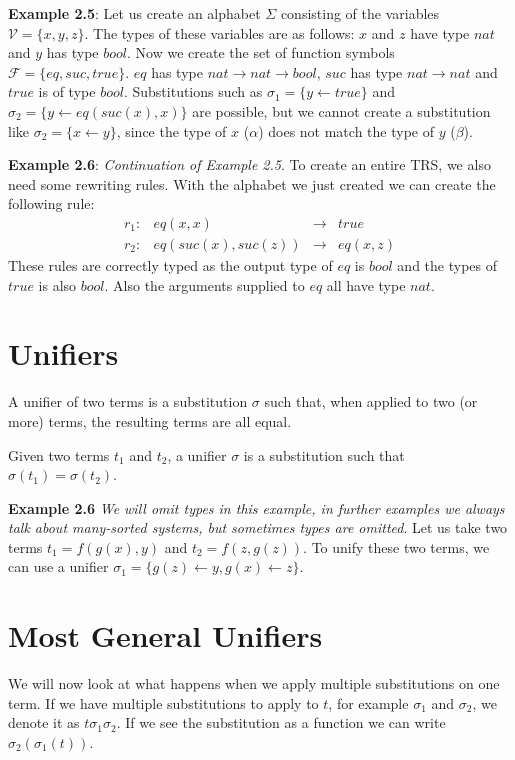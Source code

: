 \textbf{Example 2.5}: Let us create an alphabet $\Sigma$ consisting of the variables $\mathcal{V} = \{ x, y, z\}$. The types of these variables are as follows: $x$ and $z$ have type $nat$ and $y$ has type $bool$. Now we create the set of function symbols $\mathcal{F} = \{ eq, suc, true \}$. $eq$ has type $nat \rightarrow nat \rightarrow bool$, $suc$ has type $nat \rightarrow nat$ and $true$ is of type $bool$. Substitutions such as $\sigma_1 = \{ y \leftarrow true \}$ and $\sigma_2 = \{ y \leftarrow eq(suc(x), x) \}$ are possible, but we cannot create a substitution like $\sigma_2 = \{ x \leftarrow y \}$, since the type of $x$ ($\alpha$) does not match the type of $y$ ($\beta$).

\textbf{Example 2.6}: \textit{Continuation of Example 2.5}. To create an entire TRS, we also need some rewriting rules. With the alphabet we just created we can create the following rule: 
$$
\begin{array}{lrcl}
    r_1: & eq(x, x) & \rightarrow & true \\
    r_2: & eq(suc(x), suc(z)) & \rightarrow & eq(x, z)
\end{array}
$$
These rules are correctly typed as the output type of $eq$ is $bool$ and the types of $true$ is also $bool$. Also the arguments supplied to $eq$ all have type $nat$. 

\section{Unifiers}
A unifier of two terms is a substitution $\sigma$ such that, when applied to two (or more) terms, the resulting terms are all equal. 
\begin{definition}
Given two terms $t_1$ and $t_2$, a unifier $\sigma$ is a substitution such that $\sigma(t_1) = \sigma(t_2)$.
\end{definition}

\textbf{Example 2.6} \textit{We will omit types in this example, in further examples we always talk about many-sorted systems, but sometimes types are omitted}. Let us take two terms $t_1 = f(g(x), y)$ and $t_2 = f(z, g(z))$. To unify these two terms, we can use a unifier $\sigma_1 = \{ g(z) \leftarrow y, g(x) \leftarrow z \}$.

\section{Most General Unifiers}
We will now look at what happens when we apply multiple substitutions on one term. If we have multiple substitutions to apply to $t$, for example $\sigma_1$ and $\sigma_2$, we denote it as $t\sigma_1\sigma_2$. If we see the substitution as a function we can write $\sigma_2\left( 
\sigma_1(t)\right)$.

